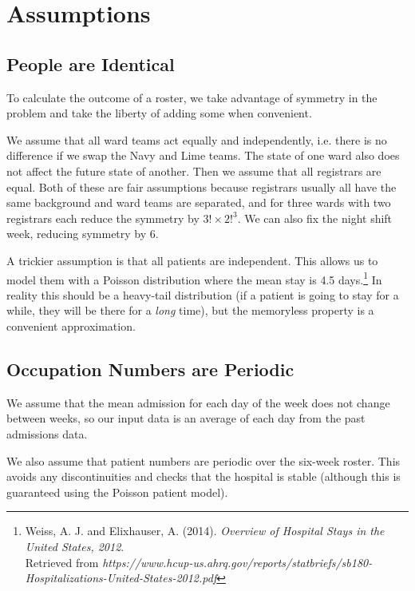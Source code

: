 \documentclass[a4paper]{article}
\begin{document}
\section{Assumptions}

\subsection{People are Identical}

To calculate the outcome of a roster, we take advantage of symmetry in the problem and take the liberty of adding some when convenient.

We assume that all ward teams act equally and independently, i.e. there is no difference if we swap the Navy and Lime teams. The state of one ward also does not affect the future state of another. Then we assume that all registrars are equal. Both of these are fair assumptions because registrars usually all have the same background and ward teams are separated, and for three wards with two registrars each reduce the symmetry by $3!\times2!^3$. We can also fix the night shift week, reducing symmetry by 6.

A trickier assumption is that all patients are independent. This allows us to model them with a Poisson distribution where the mean stay is 4.5 days.\footnote{Weiss, A. J. and Elixhauser, A. (2014). \emph{Overview of Hospital Stays in the United States, 2012}.\\Retrieved from \emph{https://www.hcup-us.ahrq.gov/reports/statbriefs/sb180-Hospitalizations-United-States-2012.pdf}} In reality this should be a heavy-tail distribution (if a patient is going to stay for a while, they will be there for a \emph{long} time), but the memoryless property is a convenient approximation.

\subsection{Occupation Numbers are Periodic}

We assume that the mean admission for each day of the week does not change between weeks, so our input data is an average of each day from the past admissions data.

We also assume that patient numbers are periodic over the six-week roster. This avoids any discontinuities and checks that the hospital is stable (although this is guaranteed using the Poisson patient model).
\end{document}
